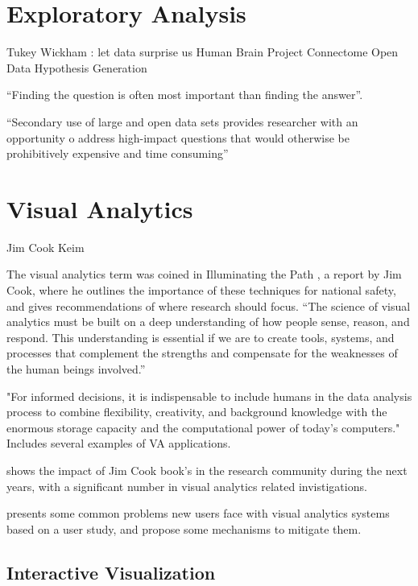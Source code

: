
\section{Exploratory Analysis}

Tukey
Wickham : let data surprise us
Human Brain Project
Connectome
Open Data
Hypothesis Generation

``Finding the question is often most important than finding the answer''\autocite{tukey_we_1980}.

``Secondary use of large and open data sets provides researcher with an opportunity o address high-impact questions that would otherwise be prohibitively expensive and time consuming'' \autocite{viangteeravat_giving_2014}



\section{Visual Analytics}



Jim Cook
Keim


The visual analytics term was coined in Illuminating the Path \autocite{cook_illuminating_2005}, a report by Jim Cook, where he outlines the importance of these techniques for national safety, and gives recommendations of 	where research should focus. ``The science of visual analytics must be built on a deep understanding of how
people sense, reason, and respond. This understanding is essential if we are to create
tools, systems, and processes that complement the strengths and compensate for the
weaknesses of the human beings involved.''


\autocite{keim_visual_2008} "For informed decisions, it is indispensable to include humans in the data analysis process to combine flexibility, creativity, and background knowledge with the enormous storage capacity and the computational power of today’s computers." Includes several examples of VA applications.

\autocite{chen_illuminated_2012} shows the impact of Jim Cook book's in the research community during the next years, with a significant number in visual analytics related invistigations.

\autocite{chul_kwon_visual_2011} presents some common problems new users face with visual analytics systems based on a user study, and propose some mechanisms to mitigate them.

\subsection{Interactive Visualization}

